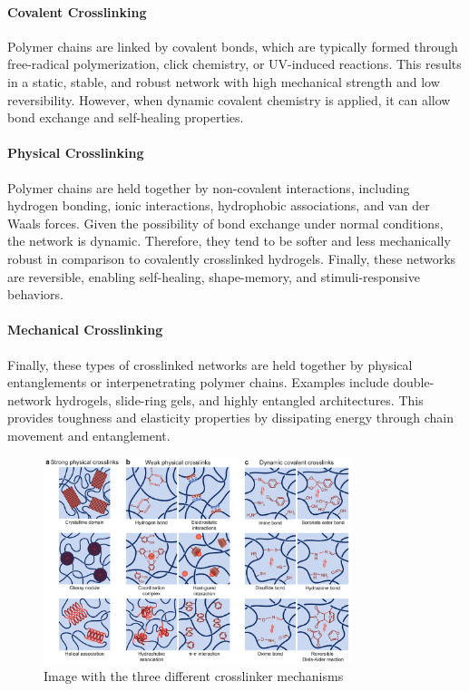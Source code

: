 \paragraph{Covalent Crosslinking} Polymer chains are linked by covalent bonds, which are typically formed through free-radical polymerization, click chemistry, or UV-induced reactions.
This results in a static, stable, and robust network with high mechanical strength and low reversibility.
However, when dynamic covalent chemistry is applied, it can allow bond exchange and self-healing properties.

\paragraph{Physical Crosslinking} Polymer chains are held together by non-covalent interactions, including hydrogen bonding, ionic interactions, hydrophobic associations, and van der Waals forces.
Given the possibility of bond exchange under normal conditions, the network is dynamic.
Therefore, they tend to be softer and less mechanically robust in comparison to covalently crosslinked hydrogels.
Finally, these networks are reversible, enabling self-healing, shape-memory, and stimuli-responsive behaviors.

\paragraph{Mechanical Crosslinking} Finally, these types of crosslinked networks are held together by physical entanglements or interpenetrating polymer chains.
Examples include double-network hydrogels, slide-ring gels, and highly entangled architectures.
This provides toughness and elasticity properties by dissipating energy through chain movement and entanglement.

\begin{figure}[!ht]
    \centering
    \includegraphics[width=0.8\textwidth]{figs/crosslinker_mechanisms.png}
    \caption{Image with the three different crosslinker mechanisms}
\end{figure}

